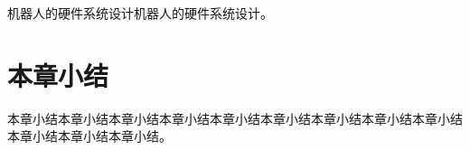 机器人的硬件系统设计机器人的硬件系统设计。



\section{本章小结}
\label{sec:2_Conclusion}

本章小结本章小结本章小结本章小结本章小结本章小结本章小结本章小结本章小结本章小结本章小结本章小结。


